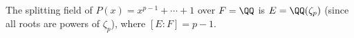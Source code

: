 
\begin{example}
    The splitting field of $P(x) = x^{p - 1} + \cdots + 1$ over $F = \QQ$ is $E = \QQ(\zeta_p)$ (since all roots are powers of $\zeta_p$), where $[E : F] = p - 1$. 
\end{example}








 

